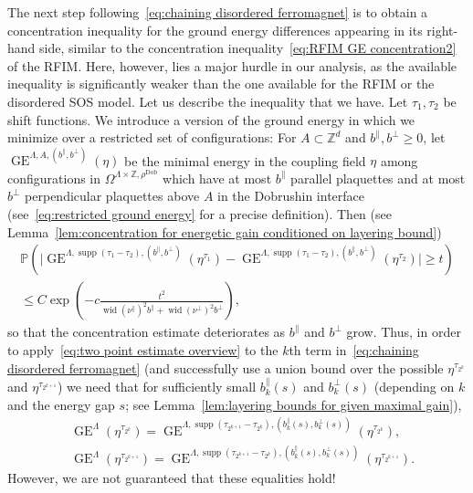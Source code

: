 \documentclass[11pt, reqno]{amsart}
\newcommand{\Z}{\mathbb{Z}}
\DeclareMathOperator{\supp}{supp}
\DeclareMathOperator{\Dob}{Dob}
\DeclareMathOperator{\GE}{GE}
\renewcommand{\P}{\mathbb{P}}
\DeclareMathOperator{\wid}{wid}
\numberwithin{equation}{section}
\begin{document}
The next step following~\eqref{eq:chaining disordered ferromagnet} is to obtain a concentration inequality for the ground energy differences appearing in its right-hand side, similar to the concentration inequality~\eqref{eq:RFIM GE concentration2} of the RFIM. Here, however, lies a major hurdle in our analysis, as the available inequality is significantly weaker than the one available for the RFIM or the disordered SOS model. Let us describe the inequality that we have. Let $\tau_1,\tau_2$ be shift functions. We introduce a version of the ground energy in which we minimize over a restricted set of configurations: For $A\subset\Z^d$ and $b^\parallel,b^\perp\ge 0$, let $\GE^{\Lambda,A,(b^\parallel,b^\perp)}(\eta)$ be the minimal energy in the coupling field $\eta$ among configurations in $\Omega^{\Lambda\times\Z,\rho^{\Dob}}$ which have at most $b^\parallel$ parallel plaquettes and at most $b^\perp$ perpendicular plaquettes above $A$ in the Dobrushin interface (see~\eqref{eq:restricted ground energy} for a precise definition). Then (see Lemma~\ref{lem:concentration for energetic gain conditioned on layering bound})
\begin{multline}\label{eq:two point estimate overview}
\P\left(\big|\GE^{\Lambda,\supp(\tau_1-\tau_2),(b^\parallel,b^\perp)}(\eta^{\tau_1}) - \GE^{\Lambda,\supp(\tau_1-\tau_2),(b^\parallel,b^\perp)}(\eta^{\tau_2})\big|\ge t\right)\\
\le C\exp \left(-c \frac{t^2}{\wid (\nu^{\parallel})^{2}  b^{\parallel}+\wid (\nu^{\perp})^{2} b^{\perp}} \right),
\end{multline} 
so that the concentration estimate deteriorates as $b^\parallel$ and $b^\perp$ grow.
Thus, in order to apply~\eqref{eq:two point estimate overview} to the $k$th term in~\eqref{eq:chaining disordered ferromagnet} (and successfully use a union bound over the possible $\eta^{\tau_{2^k}}$ and $\eta^{\tau_{2^{k+1}}}$) we need that for sufficiently small $b_k^\parallel(s)$ and $b_k^\perp(s)$ (depending on $k$ and the energy gap $s$; see Lemma~\ref{lem:layering bounds for given maximal gain}), \begin{equation}\label{eq:layering is met}
\begin{split}
&\GE^\Lambda(\eta^{\tau_{2^k}})=\GE^{\Lambda,\supp(\tau_{2^{k+1}}-\tau_{2^k}),(b_k^\parallel(s),b_k^\perp(s))}(\eta^{\tau_{2^k}}),\\
&\GE^\Lambda(\eta^{\tau_{2^{k+1}}})=\GE^{\Lambda,\supp(\tau_{2^{k+1}}-\tau_{2^k}),(b_k^\parallel(s),b_k^\perp(s))}(\eta^{\tau_{2^{k+1}}}).
\end{split}
\end{equation}
However, we are not guaranteed that these equalities hold!
\end{document}
